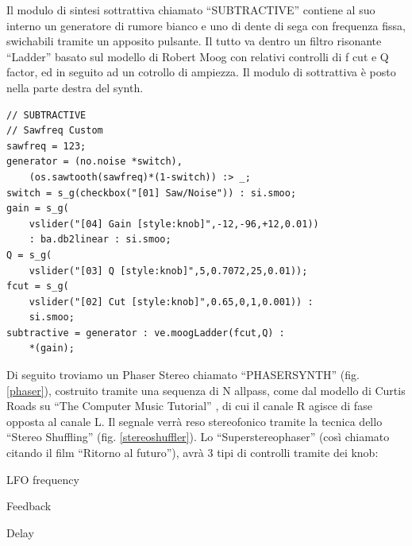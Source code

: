 \documentclass[
	a4paper,
	twocolumn
	]{article}
\begin{document}
Il modulo di sintesi sottrattiva chiamato “SUBTRACTIVE” contiene al suo interno un generatore di rumore bianco e uno di dente di sega con frequenza fissa, swichabili tramite un apposito pulsante. Il tutto va dentro un filtro risonante “Ladder” basato sul modello di Robert Moog con relativi controlli di f cut e Q factor, ed in seguito ad un cotrollo di ampiezza.
Il modulo di sottrattiva è posto nella parte destra del synth.


\begin{lstlisting}
// SUBTRACTIVE
// Sawfreq Custom
sawfreq = 123;
generator = (no.noise *switch),
	(os.sawtooth(sawfreq)*(1-switch)) :> _;
switch = s_g(checkbox("[01] Saw/Noise")) : si.smoo;
gain = s_g(
	vslider("[04] Gain [style:knob]",-12,-96,+12,0.01))
	: ba.db2linear : si.smoo;
Q = s_g(
	vslider("[03] Q [style:knob]",5,0.7072,25,0.01));
fcut = s_g(
	vslider("[02] Cut [style:knob]",0.65,0,1,0.001)) :
	si.smoo;
subtractive = generator : ve.moogLadder(fcut,Q) :
	*(gain);
\end{lstlisting}


Di seguito troviamo un Phaser Stereo chiamato “PHASERSYNTH” (fig. \ref{phaser}),
costruito tramite una sequenza di N allpass, come dal modello di Curtis Roads su
“The Computer Music Tutorial” \cite{cr96cmt}, di cui il canale R agisce di fase opposta al
canale L. Il segnale verrà reso stereofonico tramite la tecnica dello
“Stereo Shuffling” (fig. \ref{stereoshuffler}). Lo “Superstereophaser”
(così chiamato citando il film “Ritorno al futuro”), avrà 3 tipi di controlli
tramite dei knob:
\begin{compactitem}
\item LFO frequency
\item Feedback
\item Delay
\end{compactitem}
\end{document}
